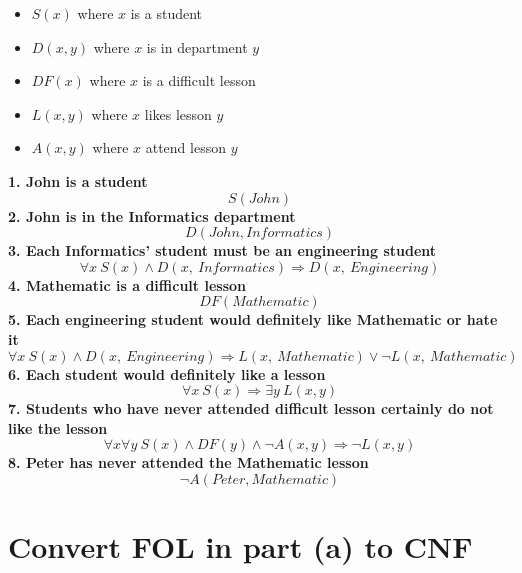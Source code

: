 \documentclass[a4paper, 12pt]{article}
\newcommand{\bd}{\textbf}
\begin{document}
\begin{itemize}
    \item $S(x)$ where $x$ is a student
    \item $D(x, y)$ where $x$ is in department $y$
    \item $DF(x)$ where $x$ is a difficult lesson
    \item $L(x, y)$ where $x$ likes lesson $y$
    \item $A(x, y)$ where $x$ attend lesson $y$
\end{itemize}
\bd{1. John is a student}
$$
    S(John)
$$
\bd{2. John is in the Informatics department}
$$
    D(John, Informatics)
$$
\bd{3. Each Informatics' student must be an engineering student}
$$
    \forall{x}\ S\left(x\right)\land D\left(x,\ Informatics\right)\Rightarrow D\left(x,\ Engineering\right)
$$
\bd{4. Mathematic is a difficult lesson}
$$
    DF(Mathematic)
$$
\bd{5. Each engineering student would definitely like Mathematic or hate it}
$$
    \forall{x}\ S\left(x\right)\land D\left(x,\ Engineering\right)\Rightarrow L\left(x,\ Mathematic\right)\vee\lnot L\left(x,\ Mathematic\right)
$$
\bd{6. Each student would definitely like a lesson}
$$
    \forall{x}\ S(x) \Rightarrow \exists{y}\ L(x, y)
$$
\bd{7. Students who have never attended difficult lesson certainly do not like the lesson}
$$
    \forall{x}\forall{y}\ S(x) \land DF(y) \land \lnot A(x, y) \Rightarrow \lnot L(x, y)
$$
\bd{8. Peter has never attended the Mathematic lesson}
$$
    \lnot A(Peter, Mathematic)
$$
\newpage

\section*{Convert FOL in part (a) to CNF}
\end{document}
